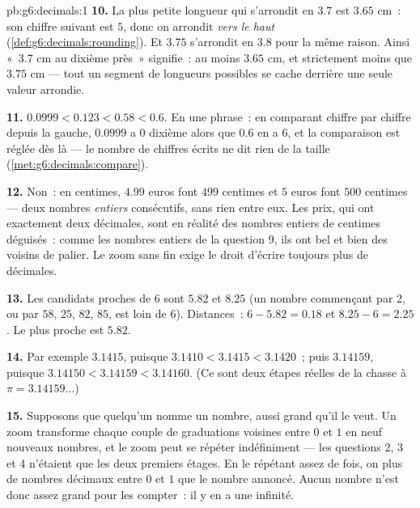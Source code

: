 \begin{solution}{pb:g6:decimals:1}
\textbf{10.} La plus petite longueur qui s'arrondit en $3.7$ est
$3.65$ cm~: son chiffre suivant est $5$, donc on arrondit \emph{vers
le haut} (\cref{def:g6:decimals:rounding}). Et $3.75$ s'arrondit en
$3.8$ pour la même raison. Ainsi «~$3.7$ cm au dixième près~»
signifie~: au moins $3.65$ cm, et strictement moins que $3.75$ cm ---
tout un segment de longueurs possibles se cache derrière une seule
valeur arrondie.

\textbf{11.} $0.0999 < 0.123 < 0.58 < 0.6$. En une phrase~: en
comparant chiffre par chiffre depuis la gauche, $0.0999$ a $0$
dixième alors que $0.6$ en a $6$, et la comparaison est réglée dès là
--- le nombre de chiffres écrits ne dit rien de la taille
(\cref{met:g6:decimals:compare}).

\textbf{12.} Non~: en centimes, $4.99$ euros font $499$ centimes et
$5$ euros font $500$ centimes --- deux nombres \emph{entiers}
consécutifs, sans rien entre eux. Les prix, qui ont exactement deux
décimales, sont en réalité des nombres entiers de centimes
déguisés~: comme les nombres entiers de la question 9, ils ont bel et
bien des voisins de palier. Le zoom sans fin exige le droit d'écrire
toujours plus de décimales.

\textbf{13.} Les candidats proches de $6$ sont $5.82$ et $8.25$ (un
nombre commençant par $2$, ou par $58$, $25$, $82$, $85$, est loin de
$6$). Distances~: $6 - 5.82 = 0.18$ et $8.25 - 6 = 2.25$. Le plus
proche est $5.82$.

\textbf{14.} Par exemple $3.1415$, puisque
$3.1410 < 3.1415 < 3.1420$~; puis $3.14159$, puisque
$3.14150 < 3.14159 < 3.14160$. (Ce sont deux étapes réelles de la
chasse à $\pi = 3.14159\dots$)

\textbf{15.} Supposons que quelqu'un nomme un nombre, aussi grand
qu'il le veut. Un zoom transforme chaque couple de graduations
voisines entre $0$ et $1$ en neuf nouveaux nombres, et le zoom peut
se répéter indéfiniment --- les questions 2, 3 et 4 n'étaient que les
deux premiers étages. En le répétant assez de fois, on  plus
de nombres décimaux entre $0$ et $1$ que le nombre annoncé. Aucun
nombre n'est donc assez grand pour les compter~: il y en a une
infinité.
\end{solution}
